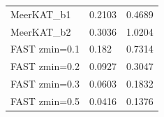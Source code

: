 \documentclass[UTF8]{beamer}
\begin{document}
\begin{frame}
\begin{columns}[c]
\begin{table}[]
\begin{tabular}{l|ll}
                MeerKAT\_b1          & 0.2103              & 0.4689              \\
                MeerKAT\_b2          & 0.3036              & 1.0204              \\
                FAST zmin=0.1        & 0.182               & 0.7314              \\
                FAST zmin=0.2        & 0.0927              & 0.3047              \\
                FAST zmin=0.3        & 0.0603              & 0.1832              \\
                FAST zmin=0.5        & 0.0416              & 0.1376              \\ \hline
                \end{tabular}
                \end{table}
        \end{columns}
    \end{frame}
\end{document}
